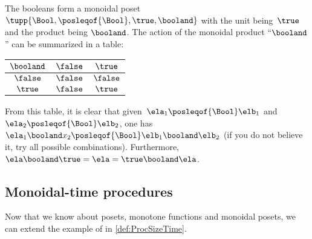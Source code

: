 \begin{example}
    The booleans form a monoidal poset $\tupp{\Bool,\posleqof{\Bool},\true,\booland}$
    with the unit being~$\true$ and the product being $\booland$.
    The action of the monoidal product ``$\booland$'' can be summarized in a table:
    \begin{center}
        \begin{tabular}{c|cc}
            $\booland$ & $\false$ & $\true$  \\
            \hline
            $\false$   & $\false$ & $\false$ \\
            $\true$    & $\false$ & $\true$
        \end{tabular}
    \end{center}
    From this table, it is clear that given~$\ela_1\posleqof{\Bool}\elb_1$ and~$\ela_2\posleqof{\Bool} \elb_2$, one has~$\ela_1\booland x_2\posleqof{\Bool} \elb_1\booland \elb_2$ (if you do not believe it, try all possible combinations).
    Furthermore,~$\ela\booland \true=\ela=\true \booland \ela$.
\end{example}


\subsection{Monoidal-time procedures}
\label{sub:ProcMod}

Now that we know about posets, monotone functions and monoidal posets, we can extend the example of \ProcSizeTime in \vref{def:ProcSizeTime}.

